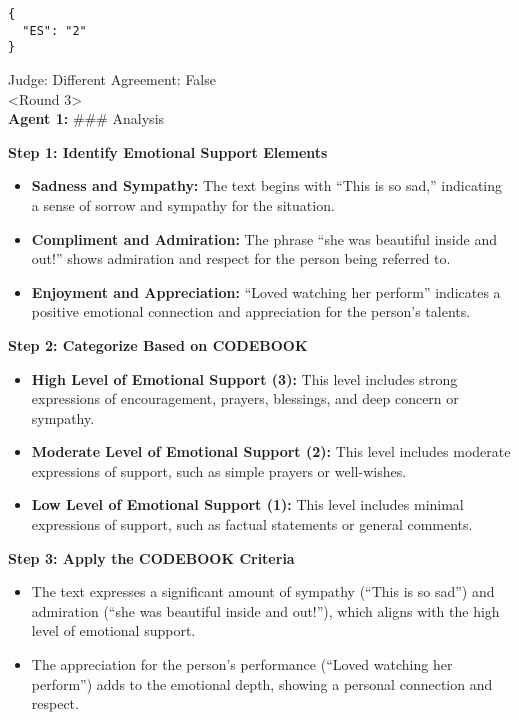 \begin{verbatim}
{
  "ES": "2"
}
\end{verbatim}

Judge: Different Agreement: False\\

<Round 3>\\

\textbf{Agent 1:} \#\#\# Analysis

\textbf{Step 1: Identify Emotional Support Elements}

\begin{itemize}
\tightlist
\item
  \textbf{Sadness and Sympathy:} The text begins with ``This is so
  sad,'' indicating a sense of sorrow and sympathy for the situation.
\item
  \textbf{Compliment and Admiration:} The phrase ``she was beautiful
  inside and out!'' shows admiration and respect for the person being
  referred to.
\item
  \textbf{Enjoyment and Appreciation:} ``Loved watching her perform''
  indicates a positive emotional connection and appreciation for the
  person's talents.
\end{itemize}

\textbf{Step 2: Categorize Based on CODEBOOK}

\begin{itemize}
\tightlist
\item
  \textbf{High Level of Emotional Support (3):} This level includes
  strong expressions of encouragement, prayers, blessings, and deep
  concern or sympathy.
\item
  \textbf{Moderate Level of Emotional Support (2):} This level includes
  moderate expressions of support, such as simple prayers or
  well-wishes.
\item
  \textbf{Low Level of Emotional Support (1):} This level includes
  minimal expressions of support, such as factual statements or general
  comments.
\end{itemize}

\textbf{Step 3: Apply the CODEBOOK Criteria}

\begin{itemize}
\tightlist
\item
  The text expresses a significant amount of sympathy (``This is so
  sad'') and admiration (``she was beautiful inside and out!''), which
  aligns with the high level of emotional support.
\item
  The appreciation for the person's performance (``Loved watching her
  perform'') adds to the emotional depth, showing a personal connection
  and respect.
\end{itemize}

